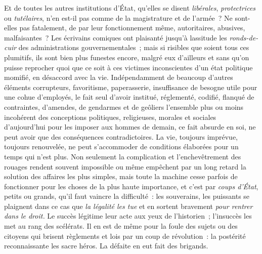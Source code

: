 \documentclass[french,twoside]{book} %
\begin{document}
Et de toutes les autres institutions d’État, qu’elles se disent \emph{libérales}, \emph{protectrices} ou \emph{tutélaires}, n’en est-il pas comme de la magistrature et de l’armée ? Ne sont-elles pas fatalement, de par leur fonctionnement même, autoritaires, abusives, malfaisantes ? Les écrivains comiques ont plaisanté jusqu’à lassitude les \emph{ronds-de-cuir} des administrations gouvernementales ; mais si risibles que soient tous ces plumitifs, ils sont bien plus funestes encore, malgré eux d’ailleurs et sans  qu’on puisse reprocher quoi que ce soit à ces victimes inconscientes d’un état politique momifié, en désaccord avec la vie. Indépendamment de beaucoup d’autres éléments corrupteurs, favoritisme, paperasserie, insuffisance de besogne utile pour une cohue d’employés, le fait seul d’avoir institué, réglementé, codifié, flanqué de contraintes, d’amendes, de gendarmes et de geôliers l’ensemble plus ou moins incohérent des conceptions politiques, religieuses, morales et sociales d’aujourd’hui pour les imposer aux hommes de demain, ce fait absurde en soi, ne peut avoir que des conséquences contradictoires. La vie, toujours imprévue, toujours renouvelée, ne peut s’accommoder de conditions élaborées pour un temps qui n’est plus.  Non seulement la complication et l’enchevêtrement des rouages rendent souvent impossible ou même empêchent par un long retard la solution des affaires les plus simples, mais toute la machine cesse parfois de fonctionner pour les choses de la plus haute importance, et c’est par \emph{coups d’État}, petits ou grands, qu’il faut vaincre la difficulté : les souverains, les puissants se plaignent dans ce cas que \emph{la légalité les tue} et en sortent bravement \emph{pour rentrer dans le droit.} Le succès légitime leur acte aux yeux de l’historien ; l’insuccès les met au rang des scélérats. Il en est de même pour la foule des sujets ou des citoyens qui brisent règlements et lois par un coup de révolution : la postérité reconnaissante les sacre  héros. La défaite en eut fait des brigands.\par
\end{document}
